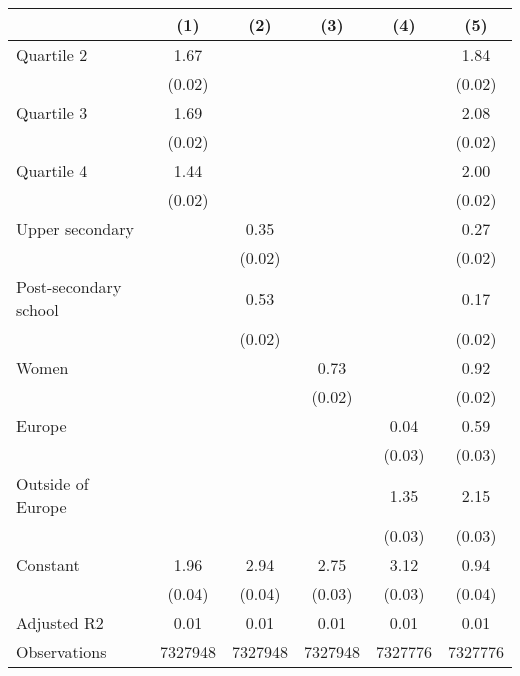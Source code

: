 
\begin{tabular}{@{}l*{5}{S[table-format={-}2.2{\tnote{***}}]}@{}}
\toprule
{} & {(1)} & {(2)} & {(3)} & {(4)} & {(5)}\tabularnewline%
\midrule
Quartile 2 & 1.67\tnote{***} &  &  &  & 1.84\tnote{***}\tabularnewline%
 & (0.02) &  &  &  & \vphantom{2} (0.02)\tabularnewline%
Quartile 3 & 1.69\tnote{***} &  &  &  & 2.08\tnote{***}\tabularnewline%
 & (0.02) &  &  &  & \vphantom{1} (0.02)\tabularnewline%
Quartile 4 & 1.44\tnote{***} &  &  &  & 2.00\tnote{***}\tabularnewline%
 & (0.02) &  &  &  & (0.02)\tabularnewline%
Upper secondary &  & 0.35\tnote{***} &  &  & 0.27\tnote{***}\tabularnewline%
 &  & (0.02) &  &  & \vphantom{1} (0.02)\tabularnewline%
Post-secondary school &  & 0.53\tnote{***} &  &  & 0.17\tnote{***}\tabularnewline%
 &  & (0.02) &  &  & (0.02)\tabularnewline%
Women &  &  & 0.73\tnote{***} &  & 0.92\tnote{***}\tabularnewline%
 &  &  & (0.02) &  & (0.02)\tabularnewline%
Europe &  &  &  & 0.04\tnote{\dagger} & 0.59\tnote{***}\tabularnewline%
 &  &  &  & (0.03) & \vphantom{1} (0.03)\tabularnewline%
Outside of Europe &  &  &  & 1.35\tnote{***} & 2.15\tnote{***}\tabularnewline%
 &  &  &  & (0.03) & (0.03)\tabularnewline%
Constant & 1.96\tnote{***} & 2.94\tnote{***} & 2.75\tnote{***} & 3.12\tnote{***} & 0.94\tnote{***}\tabularnewline%
 & (0.04) & (0.04) & (0.03) & (0.03) & (0.04)\tabularnewline%
\midrule
Adjusted R2 & 0.01 & 0.01 & 0.01 & 0.01 & 0.01\tabularnewline%
Observations & {\num{7327948}} & {\num{7327948}} & {\num{7327948}} & {\num{7327776}} & {\num{7327776}}\tabularnewline%
\bottomrule
\end{tabular}

